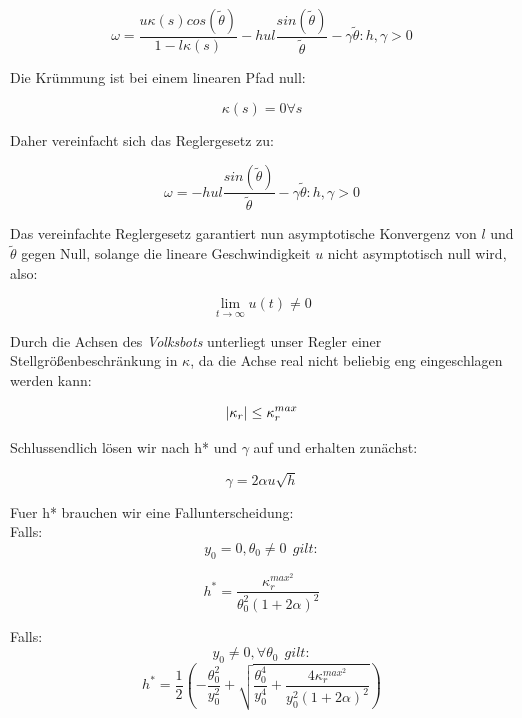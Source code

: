 \documentclass[11pt,a4paper]{article}
\DeclarePairedDelimiter\abs{\lvert}{\rvert}
\begin{document}
\begin{equation}
  \omega = \frac{u\kappa(s)cos(\tilde{\theta})}{1-l\kappa(s)} - hul\frac{sin(\tilde{\theta})}{\tilde{\theta}}-\gamma\tilde{\theta} : h,\gamma > 0
\end{equation}

Die Krümmung ist bei einem linearen Pfad null:

\begin{equation}
  \kappa(s) = 0 \forall s
\end{equation}

Daher vereinfacht sich das Reglergesetz zu:

\begin{equation}
  \omega = -hul\frac{sin(\tilde{\theta})}{\tilde{\theta}}-\gamma\tilde{\theta} : h,\gamma > 0
\end{equation}


Das vereinfachte Reglergesetz garantiert nun asymptotische Konvergenz von $l$ und $\tilde{\theta}$ gegen Null, solange die lineare Geschwindigkeit $u$ nicht asymptotisch
null wird, also: 

\begin{equation}
  \lim_{t \to \infty} u(t) \neq 0
\end{equation}

Durch die Achsen des \textit{Volksbots} unterliegt unser Regler einer Stellgrößenbeschränkung in $\kappa$, da die Achse real nicht beliebig eng eingeschlagen werden kann:

\begin{equation}
  \abs{\kappa_r} \leq \kappa_r^{max}
\end{equation}

Schlussendlich lösen wir nach h* und $\gamma$ auf und erhalten zunächst:

\begin{equation}
  \gamma = 2\alpha u \sqrt{h}
\end{equation}

Fuer h* brauchen wir eine Fallunterscheidung: \\
Falls:
\begin{equation*}
  y_0 = 0, \theta_0 \neq 0~~ gilt:
\end{equation*}

\begin{equation}
  h^* = \frac{\kappa_r^{max^2}}{\theta_0^2(1+2\alpha)^2}
\end{equation}

Falls:
\begin{equation*}
  y_0 \neq 0, \forall \theta_0~~ gilt:
\end{equation*}
\begin{equation}
  h^* = \frac{1}{2}\left(-\frac{\theta_0^2}{y_0^2} + \sqrt{ \frac{\theta_0^4}{y_0^4}+ \frac {4\kappa_r^{max^2}} {y_0^2(1+2\alpha)^2} } \right)
\end{equation}
\end{document}
